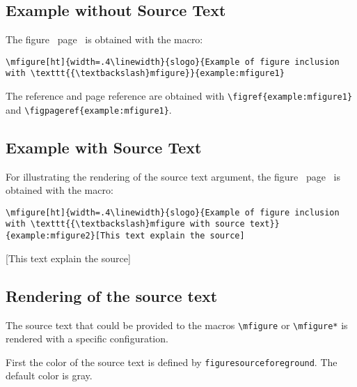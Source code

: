 \documentclass[book,taskpackage,specpackage,codepackage]{upmethodology-document}
\begin{document}
\subsection{Example without Source Text}

The figure~ page~ is obtained with the macro:

\texttt{{\textbackslash}mfigure[ht]\{width=.4{\textbackslash}linewidth\}\{slogo\}\{Example of figure inclusion with {\textbackslash}texttt\{\{{\textbackslash}textbackslash\}mfigure\}\}\{example:mfigure1\}}

The reference and page reference are obtained with \texttt{{\textbackslash}figref\{example:mfigure1\}} and \texttt{{\textbackslash}figpageref\{example:mfigure1\}}.


\subsection{Example with Source Text}

For illustrating the rendering of the source text argument, the figure~ page~ is obtained with the macro:

\texttt{{\textbackslash}mfigure[ht]\{width=.4{\textbackslash}linewidth\}\{slogo\}\{Example of figure inclusion with {\textbackslash}texttt\{\{{\textbackslash}textbackslash\}mfigure with source text\}\}\{example:mfigure2\}[This text explain the source]}

[This text explain the source]

\subsection{Rendering of the source text}

The source text that could be provided to the macros \texttt{{\textbackslash}mfigure} or \texttt{{\textbackslash}mfigure*} is rendered with a specific configuration.

First the color of the source text is defined by \texttt{figuresourceforeground}. The default color is \textcolor{figuresourceforeground}{gray}.
\end{document}
